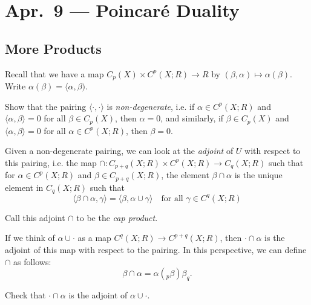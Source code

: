 \chapter{Apr.~9 --- Poincar\'e Duality}

\section{More Products}

\begin{remark}
  Recall that we have a map
  $C_p(X) \times C^p(X; R) \to R$ by
  $(\beta, \alpha) \mapsto \alpha(\beta)$.
  Write $\alpha(\beta) = \langle \alpha, \beta)$.
\end{remark}

\begin{exercise}
  Show that the pairing $\langle \cdot, \cdot \rangle$
  is \emph{non-degenerate}, i.e.
  if $\alpha \in C^p(X; R)$ and
  $\langle \alpha, \beta \rangle = 0$
  for all $\beta \in C_p(X)$, then
  $\alpha = 0$, and similarly,
  if $\beta \in C_p(X)$ and
  $\langle \alpha, \beta \rangle = 0$
  for all $\alpha \in C^p(X; R)$, then
  $\beta = 0$.
\end{exercise}

\begin{definition}
  Given a non-degenerate pairing, we can
  look at the \emph{adjoint} of $U$
  with respect to this pairing, i.e. the
  map $\cap : C_{p + q}(X; R) \times C^p(X; R) \to C_q(X; R)$
  such that for $\alpha \in C^p(X; R)$ and
  $\beta \in C_{p + q}(X; R)$, the element
  $\beta \cap \alpha$ is the unique element
  in $C_q(X; R)$ such that
  \[
    \langle \beta \cap \alpha, \gamma \rangle
    = \langle \beta, \alpha \cup \gamma \rangle
    \quad \text{for all $\gamma \in C^q(X; R)$}
  \]

  Call this adjoint $\cap$ to be the
  \emph{cap product}.
\end{definition}

\begin{remark}
  If we think of $\alpha \cup \cdot$ as
  a map $C^q(X; R) \to C^{p + q}(X; R)$,
  then $\cdot \cap \alpha$ is the adjoint
  of this map with respect to the pairing.
  In this perspective, we can define $\cap$ as
  follows:
  \[
    \beta \cap \alpha = \alpha({}_p \beta) \beta_q.
  \]
\end{remark}

\begin{exercise}
  Check that $\cdot \cap \alpha$ is the
  adjoint of $\alpha \cup \cdot$.
\end{exercise}

